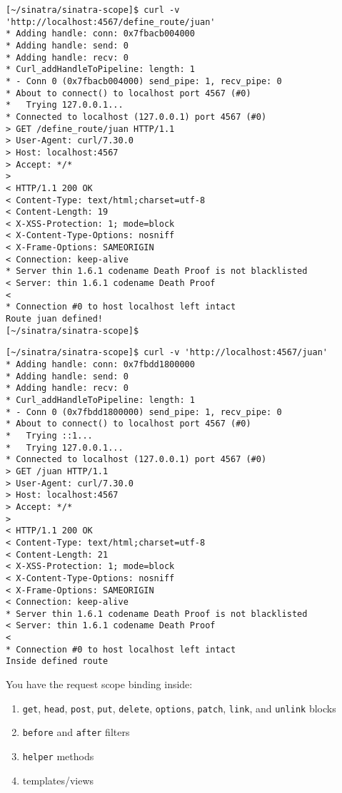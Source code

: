 \begin{verbatim}
[~/sinatra/sinatra-scope]$ curl -v 'http://localhost:4567/define_route/juan'
* Adding handle: conn: 0x7fbacb004000
* Adding handle: send: 0
* Adding handle: recv: 0
* Curl_addHandleToPipeline: length: 1
* - Conn 0 (0x7fbacb004000) send_pipe: 1, recv_pipe: 0
* About to connect() to localhost port 4567 (#0)
*   Trying 127.0.0.1...
* Connected to localhost (127.0.0.1) port 4567 (#0)
> GET /define_route/juan HTTP/1.1
> User-Agent: curl/7.30.0
> Host: localhost:4567
> Accept: */*
> 
< HTTP/1.1 200 OK
< Content-Type: text/html;charset=utf-8
< Content-Length: 19
< X-XSS-Protection: 1; mode=block
< X-Content-Type-Options: nosniff
< X-Frame-Options: SAMEORIGIN
< Connection: keep-alive
* Server thin 1.6.1 codename Death Proof is not blacklisted
< Server: thin 1.6.1 codename Death Proof
< 
* Connection #0 to host localhost left intact
Route juan defined!
[~/sinatra/sinatra-scope]$
\end{verbatim}

\begin{verbatim}
[~/sinatra/sinatra-scope]$ curl -v 'http://localhost:4567/juan'
* Adding handle: conn: 0x7fbdd1800000
* Adding handle: send: 0
* Adding handle: recv: 0
* Curl_addHandleToPipeline: length: 1
* - Conn 0 (0x7fbdd1800000) send_pipe: 1, recv_pipe: 0
* About to connect() to localhost port 4567 (#0)
*   Trying ::1...
*   Trying 127.0.0.1...
* Connected to localhost (127.0.0.1) port 4567 (#0)
> GET /juan HTTP/1.1
> User-Agent: curl/7.30.0
> Host: localhost:4567
> Accept: */*
> 
< HTTP/1.1 200 OK
< Content-Type: text/html;charset=utf-8
< Content-Length: 21
< X-XSS-Protection: 1; mode=block
< X-Content-Type-Options: nosniff
< X-Frame-Options: SAMEORIGIN
< Connection: keep-alive
* Server thin 1.6.1 codename Death Proof is not blacklisted
< Server: thin 1.6.1 codename Death Proof
< 
* Connection #0 to host localhost left intact
Inside defined route
\end{verbatim}
You have the request scope binding inside:

\begin{enumerate}
\item 
\verb|get|, \verb|head|, \verb|post|, \verb|put|, \verb|delete|, \verb|options|, \verb|patch|, \verb|link|, and \verb|unlink| blocks
\item 
\verb|before| and \verb|after| filters
\item 
\verb|helper| methods
\item 
templates/views
\end{enumerate}

